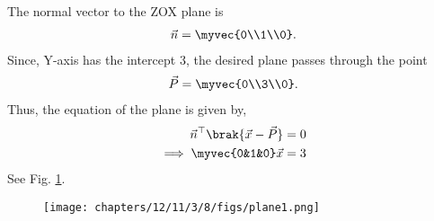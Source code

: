 The normal vector to the ZOX plane is
\begin{align} 
\vec{n} = \myvec{0\\1\\0}.
\end{align}
Since, Y-axis has the intercept 3, the desired plane passes through the point
\begin{align}
\vec{P}=\myvec{0\\3\\0}.
\end{align}
Thus, the equation of the plane is given by,
\begin{align}
	\vec{n}^\top \brak{\vec{x}-\vec{P}} &= 0\\
	\implies \myvec{0&1&0} \vec{x}&= 3
\end{align}
See Fig. 
     \ref{fig:chapters/12/11/3/8/1}.
\begin{figure}[H]
  \centering
   \texttt{[image: chapters/12/11/3/8/figs/plane1.png]}
    \caption{}
     \label{fig:chapters/12/11/3/8/1}
     \end{figure}  
